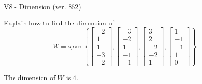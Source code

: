 \begin{exercise}
  \begin{exerciseTitle}V8 - Dimension (ver. 862)\end{exerciseTitle}
  \begin{exerciseStatement}
    Explain how to find the dimension of 
\[W=\mathrm{span}\ \left\{\left[\begin{array}{r}
-2 \\
1 \\
1 \\
-3 \\
-2
\end{array}\right] , \left[\begin{array}{r}
-3 \\
-2 \\
1 \\
-1 \\
-1
\end{array}\right] , \left[\begin{array}{r}
3 \\
2 \\
-2 \\
-2 \\
1
\end{array}\right] , \left[\begin{array}{r}
1 \\
-1 \\
-1 \\
1 \\
0
\end{array}\right]\right\}.\]



  \end{exerciseStatement}
  \begin{exerciseAnswer}
   The dimension of \(W\) is  \(4\).
  


  \end{exerciseAnswer}
\end{exercise}
